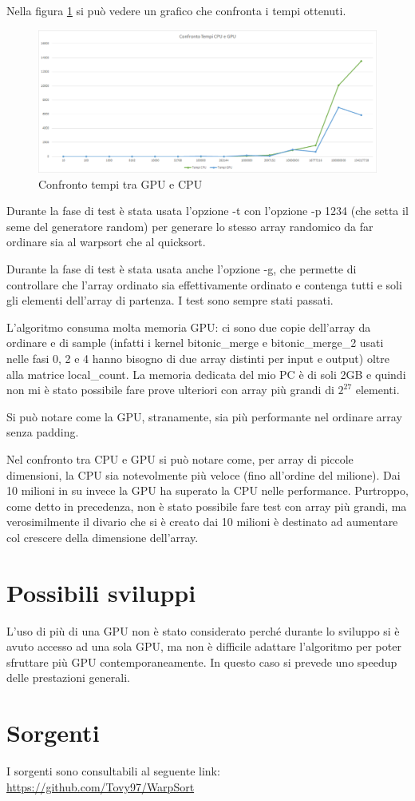 \documentclass[a4paper, 11pt]{article}
\begin{document}
		Nella figura \ref{fig:confrontotempi} si può vedere un grafico che confronta i tempi ottenuti.
		
		\begin{figure}
			\centering
			\includegraphics[width=0.99\linewidth]{img/ConfrontoTempi}
			\caption{Confronto tempi tra GPU e CPU}
			\label{fig:confrontotempi}
		\end{figure}
		
		Durante la fase di test è stata usata l'opzione -t con l'opzione -p 1234 (che setta il seme del generatore random) 
		per generare lo stesso array randomico da far ordinare sia al warpsort che al quicksort.
		
		Durante la fase di test è stata usata anche l'opzione -g, che permette di controllare che l'array ordinato sia effettivamente ordinato
		e contenga tutti e soli gli elementi dell'array di partenza. I test sono sempre stati passati.
		
		L'algoritmo consuma molta memoria GPU: ci sono due copie dell'array da ordinare e di sample 
		(infatti i kernel bitonic\_merge e bitonic\_merge\_2 usati nelle fasi 0, 2 e 4 hanno bisogno di due array distinti per input e output)
		oltre alla matrice local\_count.
		La memoria dedicata del mio PC è di soli 2GB e quindi non mi è stato possibile fare prove ulteriori 
		con array più grandi di $2^{27}$ elementi.
		
		Si può notare come la GPU, stranamente, sia più performante nel ordinare array senza padding.
		
		Nel confronto tra CPU e GPU si può notare come, per array di piccole dimensioni, la CPU sia notevolmente più veloce (fino all'ordine del 
		milione). Dai 10 milioni in su invece la GPU ha superato la CPU nelle performance. Purtroppo, come detto in precedenza, non è stato 
		possibile fare 
		test con array più grandi, ma verosimilmente il divario che si è creato dai 10 milioni è destinato ad aumentare col crescere 
		della dimensione dell'array.
	\section{Possibili sviluppi}
		L'uso di più di una GPU non è stato considerato perché durante lo sviluppo si è avuto accesso ad una sola GPU, ma non è difficile
		adattare l'algoritmo per poter sfruttare più GPU contemporaneamente. 
		In questo caso si prevede uno speedup delle prestazioni generali.
	\section{Sorgenti}
		\label{sorgenti}
		I sorgenti sono consultabili al seguente link: \url{https://github.com/Tovy97/WarpSort}
		
	\newpage
	\printbibliography		
\end{document}

